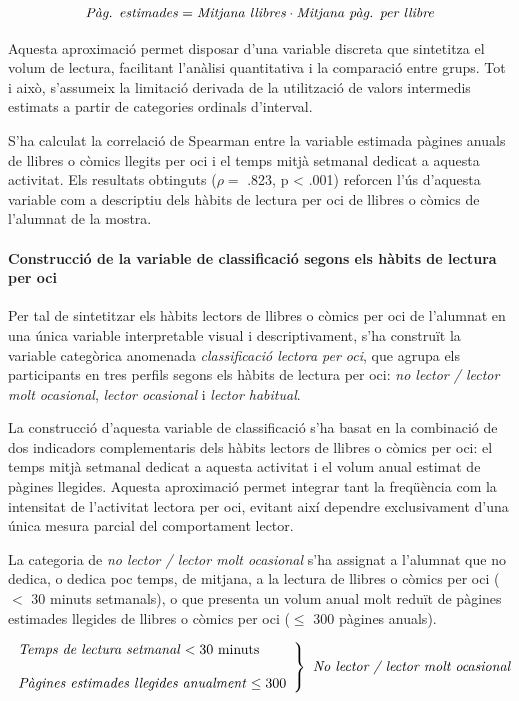 \documentclass[12pt]{article}
\begin{document}
\[
\text{\emph{Pàg. estimades}} = \text{\emph{Mitjana llibres}} \cdot \text{\emph{Mitjana pàg. per llibre}}
\]

Aquesta aproximació permet disposar d’una variable discreta que sintetitza el volum de lectura, facilitant l’anàlisi quantitativa i la comparació entre grups. Tot i això, s'assumeix la limitació derivada de la utilització de valors intermedis estimats a partir de categories ordinals d'interval.

S'ha calculat la correlació de Spearman entre la variable estimada pàgines anuals de llibres o còmics llegits per oci i el temps mitjà setmanal dedicat a aquesta activitat. Els resultats obtinguts ($\rho =$ .823, p < .001) reforcen l'ús d'aquesta variable com a descriptiu dels hàbits de lectura per oci de llibres o còmics de l'alumnat de la mostra.

\paragraph{Construcció de la variable de classificació segons els hàbits de lectura per oci}

Per tal de sintetitzar els hàbits lectors de llibres o còmics per oci de l’alumnat en una única variable interpretable visual i descriptivament, s’ha construït la variable categòrica anomenada \emph{classificació lectora per oci}, que agrupa els participants en tres perfils segons els hàbits de lectura per oci: \emph{no lector / lector molt ocasional}, \emph{lector ocasional} i \emph{lector habitual}. 

La construcció d’aquesta variable de classificació s’ha basat en la combinació de dos indicadors complementaris dels hàbits lectors de llibres o còmics per oci: el temps mitjà setmanal dedicat a aquesta activitat i el volum anual estimat de pàgines llegides. Aquesta aproximació permet integrar tant la freqüència com la intensitat de l’activitat lectora per oci, evitant així dependre exclusivament d’una única mesura parcial del comportament lector.

La categoria de \emph{no lector / lector molt ocasional} s’ha assignat a l’alumnat que no dedica, o dedica poc temps, de mitjana, a la lectura de llibres o còmics per oci ($<$ 30 minuts setmanals), o que presenta un volum anual molt reduït de pàgines estimades llegides de llibres o còmics per oci ($\leq$ 300 pàgines anuals).

\[
\left.
\begin{array}{l}
\text{\emph{Temps de lectura setmanal}} < 30 \text{ minuts} \\\\
\text{\emph{Pàgines estimades llegides anualment}} \leq 300
\end{array}
\right\}
\textit{ No lector / lector molt ocasional}
\]
\end{document}
